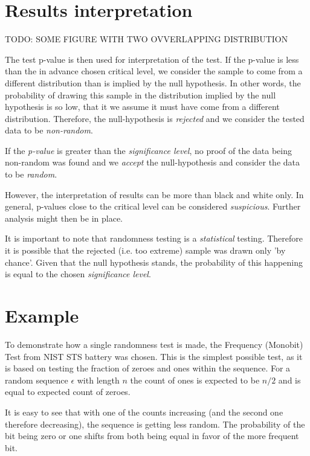 \documentclass[
  digital,     %
  oneside,     %
  nosansbold,  %
  nocolorbold, %
  nolof,         %
  nolot,         %
]{fithesis4}
\begin{document}
\section{Results interpretation} \label{chap:rand-interpretation}
TODO: SOME FIGURE WITH TWO OVVERLAPPING DISTRIBUTION

The test p-value is then used for interpretation of the test. If the p-value is less than the in advance chosen critical level, we consider the sample to come from a different distribution than is implied by the null hypothesis. In other words, the probability of drawing this sample in the distribution implied by the null hypothesis is so low, that it  we assume it must have come from a different distribution. Therefore, the null-hypothesis is \emph{rejected} and we consider the tested data to be \emph{non-random}.

If the \emph{p-value} is greater than the \emph{significance level}, no proof of the data being non-random was found and we \emph{accept} the null-hypothesis and consider the data to be \emph{random}.



However, the interpretation of results can be more than black and white only. In general, p-values close to the critical level can be considered \emph{suspicious}. Further analysis might then be in place. 

It is important to note that randomness testing is a \emph{statistical} testing. Therefore it is possible that the rejected (i.e. too extreme) sample was drawn only 'by chance'. Given that the null hypothesis stands, the probability of this happening is equal to the chosen \emph{significance level}.

\section{Example} \label{chap:rand-example}


To demonstrate how a single randomness test is made, the Frequency (Monobit) Test from NIST STS battery was chosen. \cite[p. 2-2]{nist_special} This is the simplest possible test, as it is based on testing the fraction of zeroes and ones within the sequence. For a random sequence $\epsilon$ with length $n$ the  count of ones is expected to be $n/2$ and is equal to expected count of zeroes.


It is easy to see that with one of the counts increasing (and the second one therefore decreasing), the sequence is getting less random. The probability of the bit being zero or one shifts from both being equal in favor of the more frequent bit.
\end{document}
